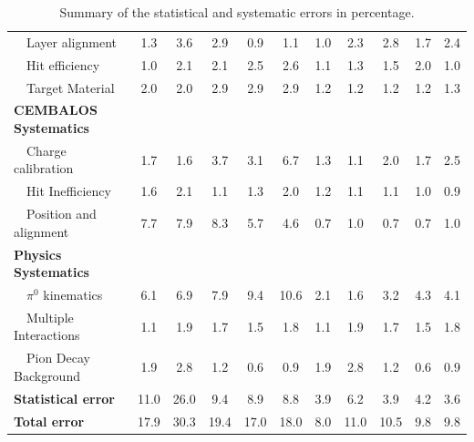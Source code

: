\begin{table}[htbp]
\begin{center}
\begin{tabular*}{\textwidth}{l|@{\extracolsep{\fill}}ccccc|ccccc}
  ~~Layer alignment& 1.3& 3.6& 2.9& 0.9& 1.1& 1.0& 2.3& 2.8& 1.7& 2.4 \\
  ~~Hit efficiency& 1.0& 2.1& 2.1& 2.5& 2.6& 1.1& 1.3& 1.5& 2.0& 1.0 \\
  ~~Target Material& 2.0& 2.0& 2.9& 2.9& 2.9& 1.2& 1.2& 1.2& 1.2& 1.3 \\
  \hline
  {\bfseries CEMBALOS Systematics} & & & & &  & & & & &\\
  ~~Charge calibration& 1.7& 1.6& 3.7& 3.1& 6.7& 1.3& 1.1& 2.0& 1.7& 2.5 \\
  ~~Hit Inefficiency& 1.6& 2.1& 1.1& 1.3& 2.0& 1.2& 1.1& 1.1& 1.0& 0.9 \\
  ~~Position and alignment & 7.7& 7.9& 8.3& 5.7& 4.6& 0.7& 1.0& 0.7& 0.7& 1.0 \\
  \hline
  {\bfseries Physics Systematics} & & & & &  & & & & &\\
  ~~$\pi^{0}$ kinematics& 6.1& 6.9& 7.9& 9.4& 10.6& 2.1& 1.6& 3.2& 4.3& 4.1 \\
  ~~Multiple Interactions& 1.1& 1.9& 1.7& 1.5& 1.8& 1.1& 1.9& 1.7& 1.5& 1.8 \\
  ~~Pion Decay Background& 1.9& 2.8& 1.2& 0.6& 0.9& 1.9& 2.8& 1.2& 0.6& 0.9 \\
  \hline
  {\bfseries Statistical error} & 11.0& 26.0& 9.4& 8.9& 8.8& 3.9& 6.2& 3.9& 4.2& 3.6 \\
  \hline\hline
  {\bfseries Total error} & 17.9& 30.3& 19.4& 17.0& 18.0& 8.0& 11.0& 10.5& 9.8& 9.8 \\
  \hline
\end{tabular*}
\caption{Summary of the statistical and systematic errors in percentage.}
\label{table:systematics}
\end{center}
\end{table}

